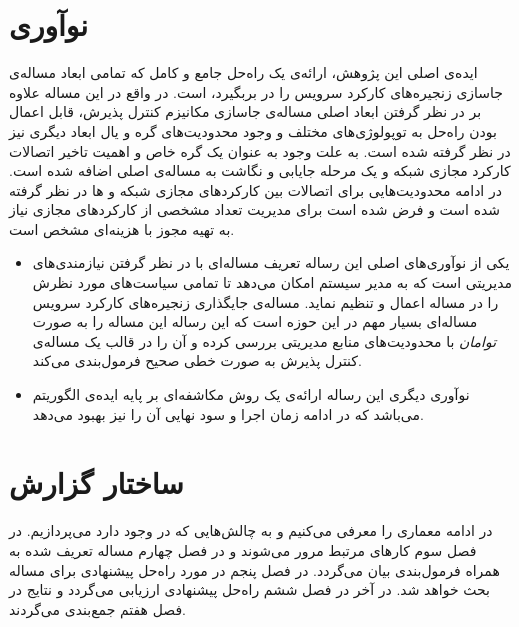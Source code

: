 \section{نوآوری}
ایده‌ی اصلی این پژوهش، ارائه‌ی یک راه‌حل جامع و کامل که تمامی ابعاد مساله‌ی جاسازی
زنجیره‌های کارکرد سرویس را در بربگیرد، است.
در واقع در این مساله علاوه بر در نظر گرفتن ابعاد اصلی مساله‌ی جاسازی مکانیزم کنترل پذیرش،
قابل اعمال بودن راه‌حل به توپولوژی‌های مختلف و وجود محدودیت‌های گره و یال ابعاد دیگری نیز در نظر گرفته شده است.
به علت وجود 
به عنوان یک گره خاص و اهمیت تاخیر اتصالات کارکرد مجازی شبکه و 
یک مرحله جایابی و نگاشت به مساله‌ی اصلی اضافه شده است.
در ادامه محدودیت‌هایی برای اتصالات بین کارکردهای مجازی شبکه و ها
در نظر گرفته شده است و فرض شده است برای مدیریت تعداد مشخصی از کارکردهای مجازی نیاز به تهیه
مجوز با هزینه‌ای مشخص است.

\begin{itemize}
    \item
    یکی از نوآوری‌های اصلی این رساله تعریف مساله‌ای با در نظر گرفتن نیازمندی‌های مدیریتی است
    که به مدیر سیستم امکان می‌دهد تا تمامی سیاست‌های مورد نظرش را در مساله اعمال و تنظیم نماید.
    مساله‌ی جایگذاری زنجیره‌های کارکرد سرویس مساله‌ای بسیار مهم در این حوزه است
    که این رساله این مساله را به صورت \emph{توامان} با محدودیت‌های منابع مدیریتی بررسی کرده و
    آن را در قالب یک مساله‌ی کنترل پذیرش به صورت خطی صحیح فرمول‌بندی می‌کند.
    \item
    نوآوری دیگری این رساله ارائه‌ی یک روش مکاشفه‌ای بر پایه ایده‌ی الگوریتم \cite{Bari2015}
    می‌باشد که در ادامه زمان اجرا و سود نهایی آن را نیز بهبود می‌دهد.
\end{itemize}

\section{ساختار گزارش}
در ادامه معماری 
را معرفی می‌کنیم
و به چالش‌هایی که در  وجود دارد می‌پردازیم.
در فصل سوم کارهای مرتبط مرور می‌شوند و در فصل چهارم مساله تعریف شده به همراه فرمول‌بندی بیان می‌گردد. در فصل پنجم
در مورد راه‌حل پیشنهادی برای مساله بحث خواهد شد.
در آخر در فصل ششم راه‌حل پیشنهادی ارزیابی می‌گردد
و نتایج در فصل هفتم جمع‌بندی می‌گردند.
